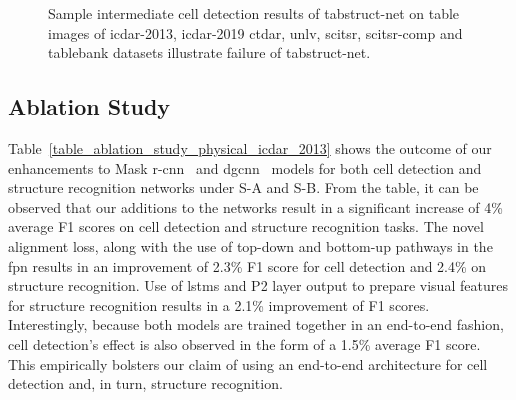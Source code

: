 \documentclass[runningheads]{llncs}
\begin{document}
\begin{figure}[ht!]
\begin{center}
\hspace{-0.01\textwidth}
\hspace{-0.01\textwidth}
\vspace{0.001\textwidth}
\hspace{-0.01\textwidth}
\hspace{-0.01\textwidth}
\end{center}
\caption{Sample intermediate cell detection results of {\sc t}ab{\sc s}truct-{\sc n}et on table images of {\sc icdar-2013}, {\sc icdar-2019} c{\sc td}a{\sc r}, {\sc unlv}, {\sc s}ci{\sc tsr}, {\sc s}ci{\sc tsr-comp} and {\sc t}able{\sc b}ank datasets illustrate failure of {\sc t}ab{\sc s}truct-{\sc n}et.}
\label{fig_failure_result}
\end{figure}

\subsection{Ablation Study}

Table~\ref{table_ablation_study_physical_icdar_2013} shows the outcome of our enhancements to Mask {\sc r-cnn}~\cite{he2017mask} and {\sc dgcnn}~\cite{qasim2019rethinking} models for both cell detection and structure recognition networks under S-A and S-B. From the table, it can be observed that our additions to the networks result in a significant increase of 4\% average F1 scores on cell detection and structure recognition tasks. The novel alignment loss, along with the use of top-down and bottom-up pathways in the {\sc fpn} results in an improvement of 2.3\% F1 score for cell detection and 2.4\% on structure recognition. Use of {\sc lstm}s and P2 layer output to prepare visual features for structure recognition results in a 2.1\% improvement of F1 scores. Interestingly, because both models are trained together in an end-to-end fashion, cell detection's effect is also observed in the form of a 1.5\% average F1 score. This empirically bolsters our claim of using an end-to-end architecture for cell detection and, in turn, structure recognition.
\end{document}
